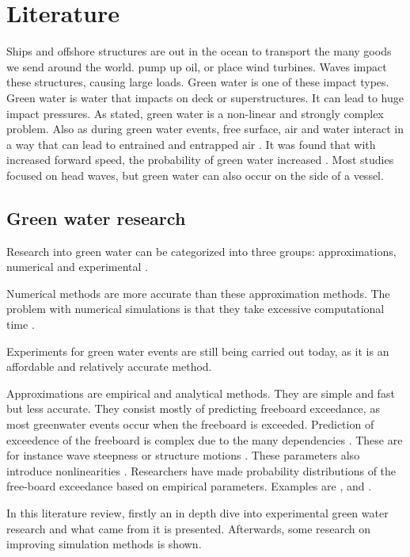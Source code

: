 \chapter{Literature}
\label{sec:literature}
Ships and offshore structures are out in the ocean to transport the many goods we send around the world. pump up oil, or place wind turbines. Waves impact these structures, causing large loads. Green water is one of these impact types.
Green water is water that impacts on deck or superstructures. It can lead to huge impact pressures. As \citet{Buchner2002} stated, green water is a non-linear and strongly complex problem. Also as during green water events, free surface, air and water interact in a way that can lead to entrained and entrapped air \cite{VanDerEijk2020a}. It was found that with increased forward speed, the probability of green water increased \cite{Greco2012, Hamoudi1998}. Most studies focused on head waves, but green water can also occur on the side of a vessel.

\section{Green water research}
\label{sec:lit_green_water}
Research into green water can be categorized into three groups: approximations, numerical and experimental \cite{ISSC2012}. 
\par 
Numerical methods are more accurate than these approximation methods. The problem with numerical simulations is that they take excessive computational time \cite{Soares2015}.  
\par 
Experiments for green water events are still being carried out today, as it is an affordable and relatively accurate method. 
\par 
Approximations are empirical and analytical methods. They are simple and fast but less accurate. They consist mostly of predicting freeboard exceedance, as most greenwater events occur when the freeboard is exceeded. 
Prediction of exceedence of the freeboard is complex due to the many dependencies \cite{Lee2020}. These are for instance wave steepness or structure motions \cite{Greco2001,Buchner2002}. These parameters also introduce nonlinearities \cite{Faltinsen2002}. Researchers have made probability distributions of the free-board exceedance based on empirical parameters. Examples are \citet{Buchner2002}, \citet{Cox2001} and \citet{Soares2005}. \par 
In this literature review, firstly an in depth dive into experimental green water research and what came from it is presented. Afterwards, some research on improving simulation methods is shown.




